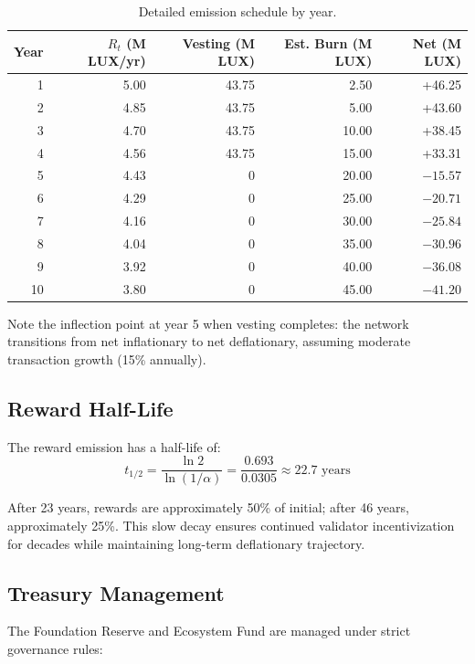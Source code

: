 \documentclass[11pt,a4paper]{article}
\begin{document}
\begin{table}[H]
\centering
\caption{Detailed emission schedule by year.}
\label{tab:emissions}
\begin{tabular}{rrrrr}
\toprule
\textbf{Year} & \textbf{$R_t$ (M LUX/yr)} & \textbf{Vesting (M LUX)} & \textbf{Est. Burn (M LUX)} & \textbf{Net (M LUX)} \\
\midrule
1 & 5.00 & 43.75 & 2.50 & +46.25 \\
2 & 4.85 & 43.75 & 5.00 & +43.60 \\
3 & 4.70 & 43.75 & 10.00 & +38.45 \\
4 & 4.56 & 43.75 & 15.00 & +33.31 \\
5 & 4.43 & 0 & 20.00 & $-15.57$ \\
6 & 4.29 & 0 & 25.00 & $-20.71$ \\
7 & 4.16 & 0 & 30.00 & $-25.84$ \\
8 & 4.04 & 0 & 35.00 & $-30.96$ \\
9 & 3.92 & 0 & 40.00 & $-36.08$ \\
10 & 3.80 & 0 & 45.00 & $-41.20$ \\
\bottomrule
\end{tabular}
\end{table}

Note the inflection point at year 5 when vesting completes: the network transitions from net inflationary to net deflationary, assuming moderate transaction growth (15\% annually).

\subsection{Reward Half-Life}

The reward emission has a half-life of:
\begin{equation}
    t_{1/2} = \frac{\ln 2}{\ln(1/\alpha)} = \frac{0.693}{0.0305} \approx 22.7 \text{ years}
\end{equation}

After 23 years, rewards are approximately 50\% of initial; after 46 years, approximately 25\%. This slow decay ensures continued validator incentivization for decades while maintaining long-term deflationary trajectory.

\subsection{Treasury Management}

The Foundation Reserve and Ecosystem Fund are managed under strict governance rules:
\end{document}
